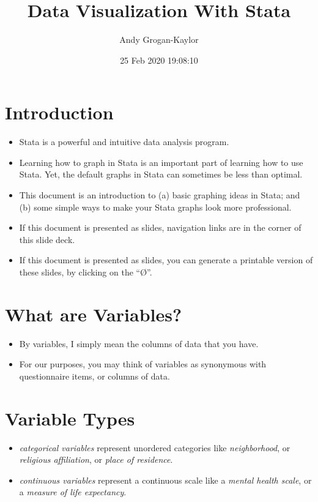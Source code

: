 \documentclass[]{article}
\title{Data Visualization With Stata}
\author{Andy Grogan-Kaylor}
\date{25 Feb 2020 19:08:10}
\providecommand{\tightlist}{%
  \setlength{\itemsep}{0pt}\setlength{\parskip}{0pt}}
\begin{document}
\maketitle

\hypertarget{introduction}{%
\section{Introduction}\label{introduction}}

\begin{itemize}
\tightlist
\item
  Stata is a powerful and intuitive data analysis program.
\item
  Learning how to graph in Stata is an important part of learning how to
  use Stata. Yet, the default graphs in Stata can sometimes be less than
  optimal.
\item
  This document is an introduction to (a) basic graphing ideas in Stata;
  and (b) some simple ways to make your Stata graphs look more
  professional.
\item
  If this document is presented as slides, navigation links are in the
  corner of this slide deck.
\item
  If this document is presented as slides, you can generate a printable
  version of these slides, by clicking on the ``Ø''.
\end{itemize}

\hypertarget{what-are-variables}{%
\section{What are Variables?}\label{what-are-variables}}

\begin{itemize}
\tightlist
\item
  By variables, I simply mean the columns of data that you have.
\item
  For our purposes, you may think of variables as synonymous with
  questionnaire items, or columns of data.
\end{itemize}

\hypertarget{variable-types}{%
\section{Variable Types}\label{variable-types}}

\begin{itemize}
\tightlist
\item
  \emph{categorical variables} represent unordered categories like
  \emph{neighborhood}, or \emph{religious affiliation}, or \emph{place
  of residence}.
\item
  \emph{continuous variables} represent a continuous scale like a
  \emph{mental health scale}, or a \emph{measure of life expectancy}.
\end{itemize}
\end{document}
